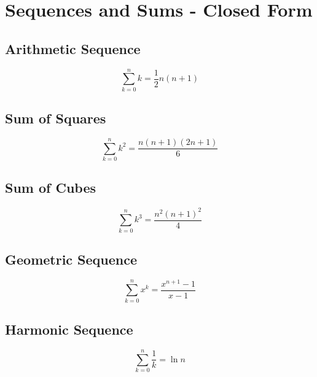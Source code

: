 \documentclass[12pt,twoside,letterpaper]{article}
\begin{document}
\section*{Sequences and Sums - Closed Form}
\subsection*{Arithmetic Sequence}
\[ \sum_{k=0}^n k = \frac{1}{2}n(n+1) \]
\subsection*{Sum of Squares}
\[ \sum_{k=0}^n k^2 = \frac{n(n+1)(2n+1)}{6} \]
\subsection*{Sum of Cubes}
\[ \sum_{k=0}^n k^3 = \frac{n^2(n+1)^2}{4} \]
\subsection*{Geometric Sequence}
\[ \sum_{k=0}^n x^k = \frac{x^{n+1} - 1}{x-1} \]
\subsection*{Harmonic Sequence}
\[ \sum_{k=0}^n \frac{1}{k} = \ln n \]
\end{document}
